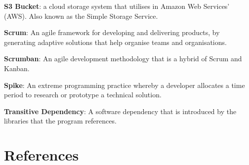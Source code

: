 \documentclass{article}
\begin{document}
{\textbf{S3 Bucket}:  a cloud storage system that utilises in Amazon Web Services' (AWS). Also known as the Simple Storage Service.

\textbf{Scrum}: An agile framework for developing and delivering products, by generating adaptive solutions that help organise teams and organisations.

\textbf{Scrumban}: An agile development methodology that is a hybrid of Scrum and Kanban.

\textbf{Spike}: An extreme programming practice whereby a developer allocates a time period to research or prototype a technical solution.

\textbf{Transitive Dependency}: A software dependency that is introduced by the libraries that the program references.
}
\newpage
\section{References}
\end{document}
